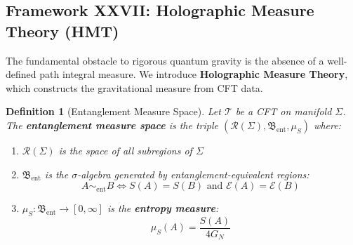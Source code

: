 \documentclass[12pt,a4paper]{article}
\newtheorem{definition}[theorem]{Definition}
\begin{document}
\subsection{Framework XXVII: Holographic Measure Theory (HMT)}
\label{subsec:holographic-measure-theory}

The fundamental obstacle to rigorous quantum gravity is the absence of a well-defined path integral measure. We introduce \textbf{Holographic Measure Theory}, which constructs the gravitational measure from CFT data.

\begin{definition}[Entanglement Measure Space]\label{def:entanglement-measure-space}
Let $\mathcal{T}$ be a CFT on manifold $\Sigma$. The \textbf{entanglement measure space} is the triple $(\mathcal{R}(\Sigma), \mathfrak{B}_{\text{ent}}, \mu_S)$ where:
\begin{enumerate}
    \item $\mathcal{R}(\Sigma)$ is the space of all subregions of $\Sigma$
    \item $\mathfrak{B}_{\text{ent}}$ is the $\sigma$-algebra generated by entanglement-equivalent regions:
    \begin{equation}
    A \sim_{\text{ent}} B \iff S(A) = S(B) \text{ and } \mathcal{E}(A) = \mathcal{E}(B)
    \end{equation}
    \item $\mu_S: \mathfrak{B}_{\text{ent}} \to [0, \infty]$ is the \textbf{entropy measure}:
    \begin{equation}
    \mu_S(A) = \frac{S(A)}{4G_N}
    \end{equation}
\end{enumerate}
\end{definition}
\end{document}

